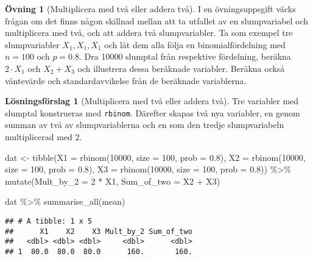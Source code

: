 \documentclass[
]{book}
\newenvironment{Shaded}{\begin{snugshade}}{\end{snugshade}}
\newcommand{\AttributeTok}[1]{\textcolor[rgb]{0.77,0.63,0.00}{#1}}
\newcommand{\DecValTok}[1]{\textcolor[rgb]{0.00,0.00,0.81}{#1}}
\newcommand{\FloatTok}[1]{\textcolor[rgb]{0.00,0.00,0.81}{#1}}
\newcommand{\FunctionTok}[1]{\textcolor[rgb]{0.00,0.00,0.00}{#1}}
\newcommand{\NormalTok}[1]{#1}
\newcommand{\OtherTok}[1]{\textcolor[rgb]{0.56,0.35,0.01}{#1}}
\newcommand{\SpecialCharTok}[1]{\textcolor[rgb]{0.00,0.00,0.00}{#1}}
\theoremstyle{definition}
\theoremstyle{definition}
\theoremstyle{definition}
\newtheorem{exercise}{Övning}[chapter]
\theoremstyle{definition}
\newtheorem{hypothesis}{Lösningsförslag}[chapter]
\theoremstyle{remark}
\begin{document}
\begin{exercise}[Multiplicera med två eller addera två]
I en övningsuppsgift väcks frågan om det finns någon skillnad mellan att ta utfallet av en slumpvariabel och multiplicera med två, och att addera två slumpvariabler. Ta som exempel tre slumpvariabler \(X_1, X_1, X_1\) och låt dem alla följa en binomialfördelning med \(n = 100\) och \(p = 0.8\). Dra 10000 slumptal från respektive fördelning, beräkna \(2 \cdot X_1\) och \(X_2 + X_3\) och illustrera dessa beräknade variabler. Beräkna också väntevärde och standardavvikelse från de beräknade variablerna.
\end{exercise}

\begin{hypothesis}[Multiplicera med två eller addera två]
Tre variabler med slumptal konstrueras med \texttt{rbinom}. Därefter skapas två nya variabler, en genom summan av två av slumpvariablerna och en som den tredje slumpvariabeln multiplicerad med 2.

\begin{Shaded}
\begin{Highlighting}[]
\NormalTok{dat }\OtherTok{\textless{}{-}} \FunctionTok{tibble}\NormalTok{(}\AttributeTok{X1 =} \FunctionTok{rbinom}\NormalTok{(}\DecValTok{10000}\NormalTok{, }\AttributeTok{size =} \DecValTok{100}\NormalTok{, }\AttributeTok{prob =} \FloatTok{0.8}\NormalTok{),}
              \AttributeTok{X2 =} \FunctionTok{rbinom}\NormalTok{(}\DecValTok{10000}\NormalTok{, }\AttributeTok{size =} \DecValTok{100}\NormalTok{, }\AttributeTok{prob =} \FloatTok{0.8}\NormalTok{),}
              \AttributeTok{X3 =} \FunctionTok{rbinom}\NormalTok{(}\DecValTok{10000}\NormalTok{, }\AttributeTok{size =} \DecValTok{100}\NormalTok{, }\AttributeTok{prob =} \FloatTok{0.8}\NormalTok{)) }\SpecialCharTok{\%\textgreater{}\%} 
  \FunctionTok{mutate}\NormalTok{(}\AttributeTok{Mult\_by\_2 =} \DecValTok{2} \SpecialCharTok{*}\NormalTok{ X1,}
         \AttributeTok{Sum\_of\_two =}\NormalTok{ X2 }\SpecialCharTok{+}\NormalTok{ X3)}

\NormalTok{dat }\SpecialCharTok{\%\textgreater{}\%} 
  \FunctionTok{summarise\_all}\NormalTok{(mean)}
\end{Highlighting}
\end{Shaded}

\begin{verbatim}
## # A tibble: 1 x 5
##      X1    X2    X3 Mult_by_2 Sum_of_two
##   <dbl> <dbl> <dbl>     <dbl>      <dbl>
## 1  80.0  80.0  80.0      160.       160.
\end{verbatim}


\end{hypothesis}
\end{document}
